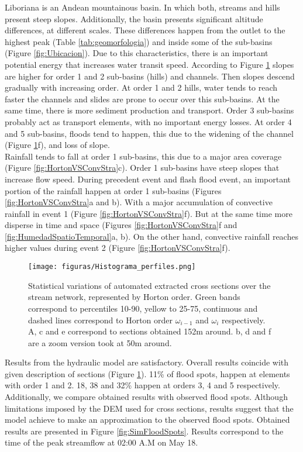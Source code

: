 {Liboriana is an Andean mountainous basin. In which both, streams and hills present steep slopes. Additionally, the basin presents significant altitude differences, at different scales.  These differences happen from the outlet to the highest peak (Table \ref{tab:geomorfologia}) and inside some of the sub-basins (Figure \ref{fig:Ubicacion}).  Due to this characteristics, there is an important potential energy that increases water transit speed. According to Figure \ref{fig:SectionsMorphology} slopes are higher for order 1 and 2 sub-basins (hills) and channels.  Then slopes descend gradually with increasing order.  At order 1 and 2 hills, water tends to reach faster the channels and slides are prone to occur over this sub-basins. At the same time, there is more sediment production and transport.  Order 3 sub-basins probably act as transport elements, with no important energy losses. At order 4 and 5 sub-basins, floods tend to happen, this due to the widening of the channel  (Figure \ref{fig:SectionsMorphology}f), and loss of slope.\\   

Rainfall tends to fall at order 1 sub-basins, this due to a major area coverage (Figure \ref{fig:HortonVSConvStra}c). Order 1 sub-basins have steep slopes that increase flow speed.  During precedent event and flash flood event, an important portion of the rainfall happen at order 1 sub-basins (Figures \ref{fig:HortonVSConvStra}a and b).  With a major accumulation of convective rainfall in event 1 (Figure \ref{fig:HortonVSConvStra}f). But at the same time more disperse in time and space (Figures \ref{fig:HortonVSConvStra}f and \ref{fig:HumedadSpatioTemporal}a, b).  On the other hand, convective rainfall reaches higher values during event  2 (Figure \ref{fig:HortonVSConvStra}f).\\

\begin{figure}[t]
\centering
 \texttt{[image: figuras/Histograma\_perfiles.png]}
 \caption{Statistical variations of automated extracted cross sections over the stream network, represented by Horton order.  Green bands correspond to percentiles 10-90, yellow to 25-75, continuous and dashed lines correspond to Horton order $\omega_{i-1}$ and $\omega_{i}$ respectively. A, c and e correspond to sections obtained 152m around.  b, d and f are a zoom version took at 50m around.}
    \label{fig:SectionsMorphology}
\end{figure}

Results from the hydraulic model are satisfactory.  Overall results coincide with given description of sections (Figure \ref{fig:SectionsMorphology}).  11\% of flood spots, happen at elements with order 1 and 2.  18, 38 and 32\% happen at orders 3, 4 and 5 respectively.  Additionally, we compare obtained results with observed flood spots.  Although limitations imposed by the DEM used for cross sections, results suggest that the model achieve to make an approximation to the observed flood spots. Obtained results are presented in Figure \ref{fig:SimFloodSpots}.  Results correspond to the time of the peak streamflow at 02:00 A.M on May 18.\\ 

}
